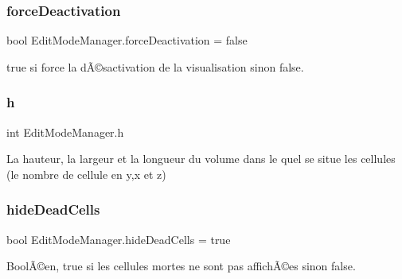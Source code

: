 \mbox{\label{class_edit_mode_manager_a2b9b6468cc837ee97b01202de2972129}} 
\subsubsection{\texorpdfstring{force\+Deactivation}{forceDeactivation}}
{\footnotesize\ttfamily bool Edit\+Mode\+Manager.\+force\+Deactivation = false\hspace{0.3cm}{\ttfamily [private]}}



true si force la dÃ©sactivation de la visualisation sinon false. 

\mbox{\label{class_edit_mode_manager_ad0e09cececc48bcb4e7b768fa35dc954}} 
\subsubsection{\texorpdfstring{h}{h}}
{\footnotesize\ttfamily int Edit\+Mode\+Manager.\+h\hspace{0.3cm}{\ttfamily [private]}}



La hauteur, la largeur et la longueur du volume dans le quel se situe les cellules (le nombre de cellule en y,x et z) 

\mbox{\label{class_edit_mode_manager_a2ad2ba7ae4c1faa2444b397f587f8adf}} 
\subsubsection{\texorpdfstring{hide\+Dead\+Cells}{hideDeadCells}}
{\footnotesize\ttfamily bool Edit\+Mode\+Manager.\+hide\+Dead\+Cells = true\hspace{0.3cm}{\ttfamily [private]}}



BoolÃ©en, true si les cellules mortes ne sont pas affichÃ©es sinon false. 

